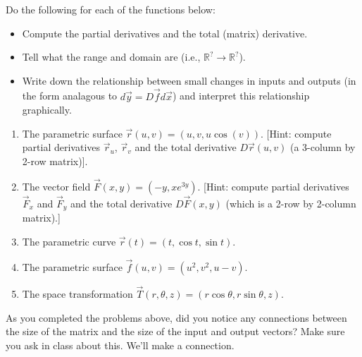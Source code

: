 \begin{problem}\label{derivative practice}%
Do the following for each of the functions below:
\begin{itemize}
\item Compute the partial derivatives and the total (matrix) derivative.
\item Tell what the range and domain are (i.e., $\mathbb{R}^?\to\mathbb{R}^?$).
\item Write down the relationship between small changes in inputs and outputs (in the form analagous to $d\vec y = D\vec f d\vec x$) and interpret this relationship graphically.
\end{itemize}

\begin{enumerate}
 \item  The parametric surface $\vec r(u,v) = (u,v,u\cos(v))$. [Hint: compute partial derivatives $\vec r_u$, $\vec r_v$ and the total derivative $D\vec r(u,v)$ (a 3-column by 2-row matrix)].
 \item  The vector field $\vec F(x,y) = (-y,xe^{3y})$.  [Hint: compute partial derivatives $\vec F_x$ and $\vec F_y$ and the total derivative $D\vec F(x,y)$ (which is a 2-row by 2-column matrix).]
\item The parametric curve $\vec r(t)=(t,\cos t,\sin t)$.
\item The parametric surface $\vec f(u,v)=(u^2,v^2,u-v)$.
\item The space transformation $\vec T(r,\theta,z)=(r\cos\theta, r\sin\theta, z)$.
\end{enumerate}
\end{problem}

As you completed the problems above, did you notice any connections between the size of the matrix and the size of the input and output vectors?  Make sure you ask in class about this.  We'll make a connection.


